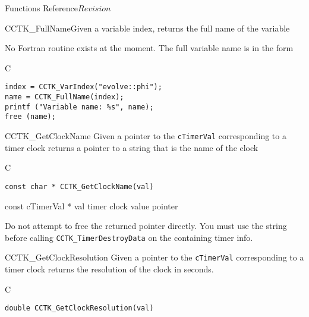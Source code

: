 \begin{cactuspart}{ Functions Reference}{}{$Revision$}
\begin{FunctionDescription}{CCTK\_FullName}{Given a variable index, returns the full name of the variable}
\begin{Discussion}
No Fortran routine exists at the moment. The full variable name is in
the form 
\end{Discussion}
\begin{ExampleSection}
\begin{Example}{C}
\begin{verbatim}
index = CCTK_VarIndex("evolve::phi");
name = CCTK_FullName(index);
printf ("Variable name: %s", name);
free (name);
\end{verbatim}
\end{Example}
\end{ExampleSection}
\end{FunctionDescription}






\begin{FunctionDescription}{CCTK\_GetClockName}
\label{CCTK-GetClockName}
Given a pointer to the {\tt cTimerVal}
corresponding to a timer clock returns a pointer to a string that is
the name of the clock
\begin{SynopsisSection}
\begin{Synopsis}{C}
\begin{verbatim}
const char * CCTK_GetClockName(val)
\end{verbatim}
\end{Synopsis}
\end{SynopsisSection}

\begin{ParameterSection}
\begin{Parameter}{const cTimerVal * val}
timer clock value pointer
\end{Parameter}
\end{ParameterSection}

\begin{Discussion}
Do not attempt to free the returned pointer directly.  You must use the
string before calling {\tt CCTK\_TimerDestroyData} on the containing
timer info.
\end{Discussion}
\end{FunctionDescription}

\begin{FunctionDescription}{CCTK\_GetClockResolution}
\label{CCTK-GetClockResolution}
Given a pointer to the
{\tt cTimerVal} corresponding to a timer clock returns the resolution of
the clock in seconds.

\begin{SynopsisSection}
\begin{Synopsis}{C}
\begin{verbatim}
double CCTK_GetClockResolution(val)
\end{verbatim}
\end{Synopsis}
\end{SynopsisSection}


\end{FunctionDescription}
\end{cactuspart}
